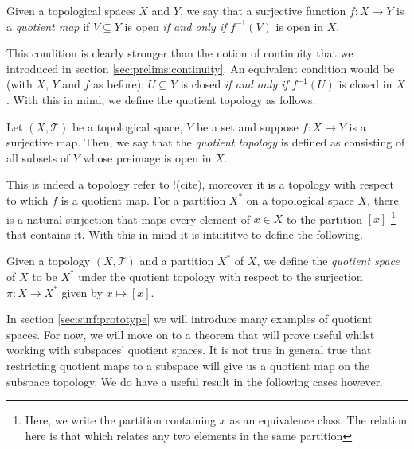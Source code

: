\begin{defn}
  Given a topological spaces $X$ and  $Y$, we say that a surjective
  function $f:X \rightarrow Y$ is a \emph{quotient map} if $V
  \subseteq Y$ is open \emph{if and only if} $f^{-1}(V)$ is open in
  $X$.
\end{defn}

This condition is clearly stronger than the notion of continuity that
we introduced in section \ref{sec:prelims:continuity}. An equivalent
condition would be (with $X$, $Y$ and $f$ as before): $U \subseteq Y$
is closed \emph{if and only if} $f^{-1}(U)$ is closed in $X$. With
this in mind, we define the quotient topology as follows:

\begin{defn}
  Let $(X,\mathscr{T})$ be a topological space, $Y$ be a set and
  suppose $f: X \rightarrow Y$ is a surjective map. Then, we say that
  the \emph{quotient topology} is defined as consisting of all subsets
  of $Y$ whose preimage is open in $X$.
\end{defn}

This is indeed a topology refer to !(cite), moreover it is a topology
with respect to which $f$ is a quotient map. For a partition $X^*$ on
a topological space $X$, there is a natural surjection that maps every
element of $x \in X$ to the partition $[x]$ \footnote{Here, we write
  the partition containing $x$ as an equivalence class. The
  relation here is that which relates any two elements in the same
  partition} that contains it. With this in mind it is intuititve to
define the following.

\begin{defn}
  Given a topology $(X, \mathscr{T})$ and a partition $X^*$ of $X$, we
  define the \emph{quotient space} of $X$ to be $X^*$ under the
  quotient topology with respect to the surjection $\pi : X
  \rightarrow X^*$ given by $x \mapsto [x]$.
\end{defn}

In section \ref{sec:surf:prototype} we will introduce many examples of
quotient spaces. For now, we will move on to a theorem that will prove
useful whilst working with subspaces' quotient spaces. It is not true
in general true that restricting quotient maps to a subspace will give
us a quotient map on the subspace topology. We do have a useful result %
in the following cases however.

